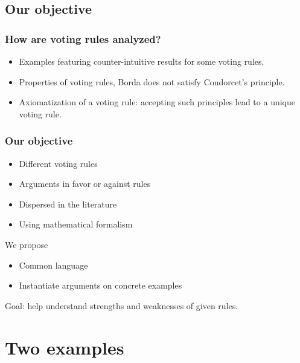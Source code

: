 \documentclass[english]{beamer}
\begin{document}
\subsection{Our objective}
\begin{frame}
	\frametitle{How are voting rules analyzed?}
	
	\begin{itemize}
		\item Examples featuring counter-intuitive results for some voting rules.
		\item Properties of voting rules, \eg Borda does not satisfy Condorcet’s principle.
		\item Axiomatization of a voting rule: accepting such principles lead to a unique voting rule.
	\end{itemize}
\end{frame}

\begin{frame}
	\frametitle{Our objective}
	
	\begin{itemize}
		\item Different voting rules
		\item Arguments in favor or against rules
		\item Dispersed in the literature
		\item Using mathematical formalism
	\end{itemize}
	\begin{block}{We propose}
		\begin{itemize}
			\item Common language
			\item Instantiate arguments on concrete examples
		\end{itemize}
	\end{block}
	Goal: help understand strengths and weaknesses of given rules.
\end{frame}


\section{Two examples}
\end{document}

